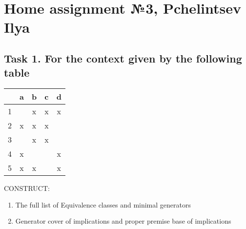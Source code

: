 \section{Home assignment №3, Pchelintsev Ilya}

\subsection{Task 1. For the context given by the following table}

\begin{center}
\begin{tabular}{ |c|c|c|c|c| } 
 \hline
	& a & b & c & d \\  \hline
	1&  & x & x & x\\  \hline
 	2& x & x & x & \\  \hline
 	3&  & x & x & \\  \hline
 	4& x &  & & x \\  \hline
 	5& x & x &  & x\\ 
 \hline
\end{tabular}
\end{center}

CONSTRUCT:
\begin{enumerate}
\item The full list of Equivalence classes and minimal generators
\item Generator cover of implications and proper premise base of implications
\end{enumerate}

